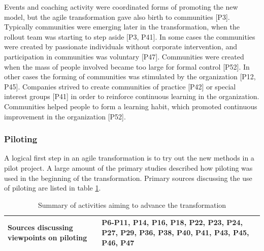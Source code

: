 \documentclass[preprint,authoryear,12pt]{elsarticle}
\begin{document}

Events and coaching activity were coordinated forms of promoting the new model,
but the agile transformation gave also birth to communities [P3]. Typically
communities were emerging later in the transformation, when the rollout team
was starting to step aside [P3, P41].
In some cases the communities were created by passionate individuals without
corporate intervention, and participation in communities was voluntary [P47].
Communities were created when the mass of people involved became too large for
formal control [P52].
In other cases the forming of communities was stimulated by the organization
[P12, P45].
Companies strived to create communities of practice [P42] or special interest
groups [P41] in order to reinforce continuous learning in the organization.
Communities helped people to form a learning habit, which promoted continuous
improvement in the organization [P52].


\subsubsection{Piloting}


A logical first step in an agile transformation is to try out the new methods in
a pilot project. A large amount of the primary studies described how piloting
was used in the beginning of the transformation. Primary sources discussing
the use of piloting are listed in table \ref{table:transformation_piloting}. 

\begin{table}[h]
    \centering
    \begin{tabular}{ >{\raggedright\arraybackslash}p{}
                     >{\raggedright\arraybackslash}p{} }
        \toprule
        Sources discussing viewpoints on piloting   & 
                P6-P11, P14, P16, P18, P22, P23, P24, P27, P29,
                P36, P38, P40, P41, P43, P45, P46, P47  \\
        \bottomrule
    \end{tabular}
    \caption{Summary of activities aiming to advance the transformation}
    \label{table:transformation_piloting}
\end{table}
\end{document}
